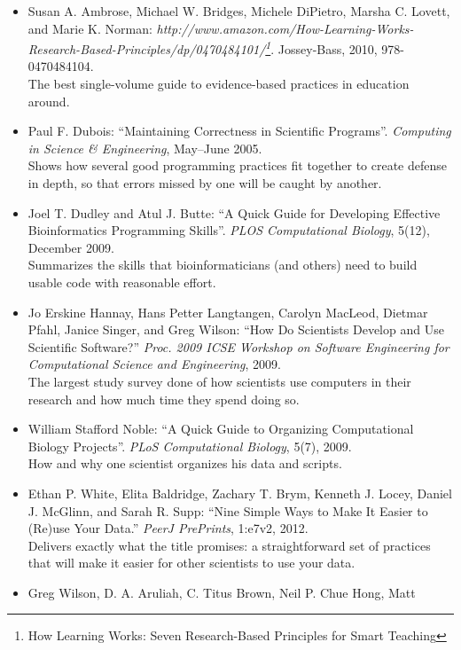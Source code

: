 \documentclass[]{book}
\newcommand{\urlfoot}[2]{{#1}\footnote{#2}}
\begin{document}
\begin{itemize}
\item
  Susan A. Ambrose, Michael W. Bridges, Michele DiPietro, Marsha C.
  Lovett, and Marie K. Norman:
  \emph{\urlfoot{http://www.amazon.com/How-Learning-Works-Research-Based-Principles/dp/0470484101/}{How
  Learning Works: Seven Research-Based Principles for Smart Teaching}}.
  Jossey-Bass, 2010, 978-0470484104. \\ The best single-volume guide to
  evidence-based practices in education around.
\item
  Paul F. Dubois: ``Maintaining Correctness in Scientific Programs''.
  \emph{Computing in Science \& Engineering}, May--June 2005. \\ Shows
  how several good programming practices fit together to create defense
  in depth, so that errors missed by one will be caught by another.
\item
  Joel T. Dudley and Atul J. Butte: ``A Quick Guide for Developing
  Effective Bioinformatics Programming Skills''. \emph{PLOS
  Computational Biology}, 5(12), December 2009. \\ Summarizes the skills
  that bioinformaticians (and others) need to build usable code with
  reasonable effort.
\item
  Jo Erskine Hannay, Hans Petter Langtangen, Carolyn MacLeod, Dietmar
  Pfahl, Janice Singer, and Greg Wilson: ``How Do Scientists Develop and
  Use Scientific Software?'' \emph{Proc. 2009 ICSE Workshop on Software
  Engineering for Computational Science and Engineering}, 2009. \\ The
  largest study survey done of how scientists use computers in their
  research and how much time they spend doing so.
\item
  William Stafford Noble: ``A Quick Guide to Organizing Computational
  Biology Projects''. \emph{PLoS Computational Biology}, 5(7), 2009. \\
  How and why one scientist organizes his data and scripts.
\item
  Ethan P. White, Elita Baldridge, Zachary T. Brym, Kenneth J. Locey,
  Daniel J. McGlinn, and Sarah R. Supp: ``Nine Simple Ways to Make It
  Easier to (Re)use Your Data.'' \emph{PeerJ PrePrints}, 1:e7v2, 2012.
  \\ Delivers exactly what the title promises: a straightforward set of
  practices that will make it easier for other scientists to use your
  data.
\item
  Greg Wilson, D. A. Aruliah, C. Titus Brown, Neil P. Chue Hong, Matt

\end{itemize}
\end{document}
